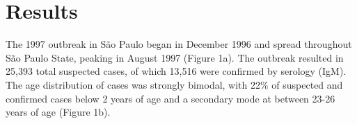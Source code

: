 \section{\texorpdfstring{\textbf{Results}}{Results}}\label{results}

The 1997 outbreak in S\~{a}o Paulo began in December 1996 and spread throughout
S\~{a}o Paulo State, peaking in August 1997 (Figure 1a). The outbreak
resulted in 25,393 total suspected cases, of which 13,516 were confirmed
by serology (IgM). The age distribution of cases was strongly bimodal,
with 22\% of suspected and confirmed cases below 2 years of age and a
secondary mode at between 23-26 years of age (Figure 1b).